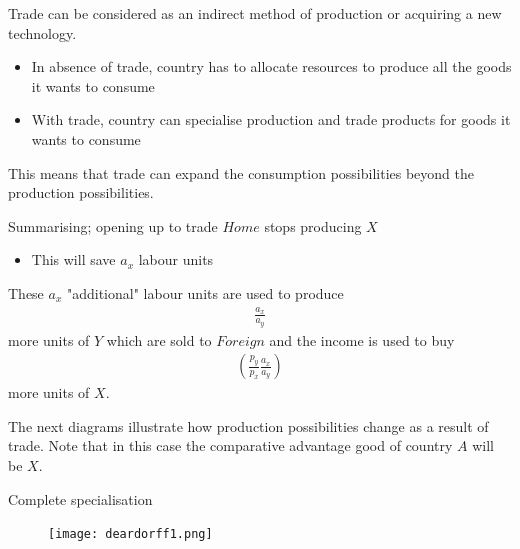 \documentclass{beamer}
\begin{document}
\begin{frame}
  Trade can be considered as an indirect method of production or acquiring a new technology.
  \medskip
  \begin{itemize}
    \item In absence of trade, country has to allocate resources to produce all the goods it wants to consume
    \item With trade, country can specialise production and trade products for goods it wants to consume
  \end{itemize}
  \medskip
  This means that trade can expand the consumption possibilities beyond the production possibilities. 
\end{frame}

\begin{frame}
  Summarising; opening up to trade $Home$ stops producing $X$
  \begin{itemize}
    \item This will save $a_x$ labour units
  \end{itemize}
  \medskip
  These $a_x$ "additional" labour units are used to produce
  \begin{align*}
    \frac{a_x}{a_y}
  \end{align*}
  more units of $Y$ which are sold to $Foreign$ and the income is used to buy
  \begin{align*}
    \left(\frac{p_y}{p_x}\frac{a_x}{a_y} \right) 
  \end{align*}
  more units of $X$.
\end{frame}

\begin{frame}
 The next diagrams illustrate how production possibilities change as a result of trade. 
 Note that in this case the comparative advantage good of country $A$ will be $X$.
\end{frame}

\begin{frame}{Complete specialisation}
  \begin{figure}
    \texttt{[image: deardorff1.png]}
  \end{figure}
\end{frame}
\end{document}
